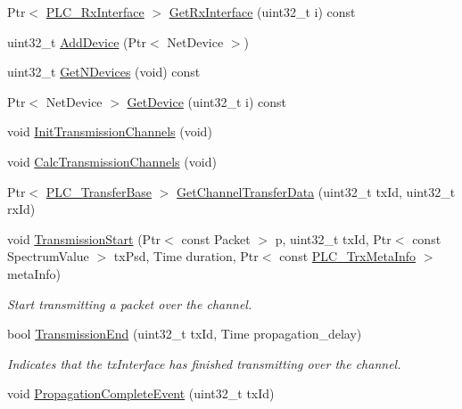 \begin{DoxyCompactItemize}
\item 
\-Ptr$<$ \hyperlink{classns3_1_1PLC__RxInterface}{\-P\-L\-C\-\_\-\-Rx\-Interface} $>$ \hyperlink{classns3_1_1PLC__Channel_aa9fe1d783e2d3662649835c99232f04d}{\-Get\-Rx\-Interface} (uint32\-\_\-t i) const 
\item 
uint32\-\_\-t \hyperlink{classns3_1_1PLC__Channel_ad89f6779ad4976cd5acfbe072996eff6}{\-Add\-Device} (\-Ptr$<$ \-Net\-Device $>$)
\item 
uint32\-\_\-t \hyperlink{classns3_1_1PLC__Channel_abf943700252f5244e10ba042f142ee6f}{\-Get\-N\-Devices} (void) const 
\item 
\-Ptr$<$ \-Net\-Device $>$ \hyperlink{classns3_1_1PLC__Channel_a3b85c19d252573c3efc1578613b22f9d}{\-Get\-Device} (uint32\-\_\-t i) const 
\item 
void \hyperlink{classns3_1_1PLC__Channel_a9210af0d915d96817f77e21000deb5a5}{\-Init\-Transmission\-Channels} (void)
\item 
void \hyperlink{classns3_1_1PLC__Channel_a2bb68af9c30a3d0c4f7a264c4e90ddab}{\-Calc\-Transmission\-Channels} (void)
\item 
\-Ptr$<$ \hyperlink{classns3_1_1PLC__ValueBase}{\-P\-L\-C\-\_\-\-Transfer\-Base} $>$ \hyperlink{classns3_1_1PLC__Channel_ae0ccd3520dbb21ed05cb006f817a89c7}{\-Get\-Channel\-Transfer\-Data} (uint32\-\_\-t tx\-Id, uint32\-\_\-t rx\-Id)
\item 
void \hyperlink{classns3_1_1PLC__Channel_adeb6bba5a291bd4508c20dae60d46ce6}{\-Transmission\-Start} (\-Ptr$<$ const \-Packet $>$ p, uint32\-\_\-t tx\-Id, \-Ptr$<$ const \-Spectrum\-Value $>$ tx\-Psd, \-Time duration, \-Ptr$<$ const \hyperlink{classns3_1_1PLC__TrxMetaInfo}{\-P\-L\-C\-\_\-\-Trx\-Meta\-Info} $>$ meta\-Info)
\begin{DoxyCompactList}\small\item\em \-Start transmitting a packet over the channel. \end{DoxyCompactList}\item 
bool \hyperlink{classns3_1_1PLC__Channel_ab856d23667e7f0ac87a2c95a482a695c}{\-Transmission\-End} (uint32\-\_\-t tx\-Id, \-Time propagation\-\_\-delay)
\begin{DoxyCompactList}\small\item\em \-Indicates that the tx\-Interface has finished transmitting over the channel. \end{DoxyCompactList}\item 
void \hyperlink{classns3_1_1PLC__Channel_a787ab20c1ee23c65a47de50adb917a68}{\-Propagation\-Complete\-Event} (uint32\-\_\-t tx\-Id)

\end{DoxyCompactItemize}
